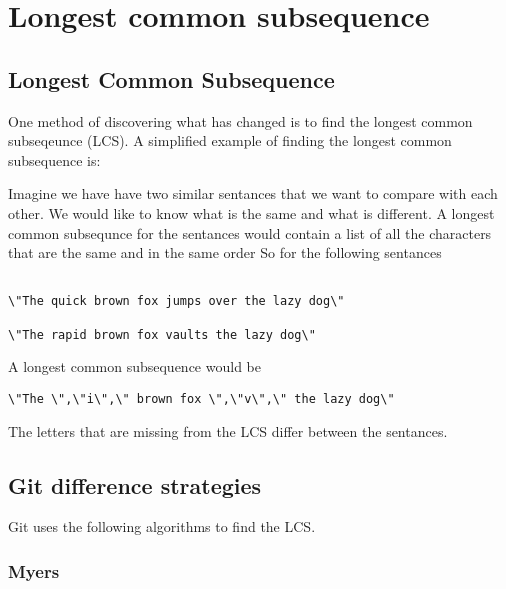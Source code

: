 \chapter{Longest common subsequence}

\section{Longest Common Subsequence}
One method of discovering what has changed is to find the longest common subseqeunce (LCS).
A simplified example of finding the longest common subsequence is:

Imagine we have have two similar sentances that we want to compare with each other.  
We would like to know what is the same and what is different.
A longest common subsequnce for the sentances would contain a list of all the characters that are the same and in the same order
So for the following sentances

\begin{verbatim}

\"The quick brown fox jumps over the lazy dog\"

\"The rapid brown fox vaults the lazy dog\"

\end{verbatim}
A longest common subsequence would be
\begin{verbatim}
\"The \",\"i\",\" brown fox \",\"v\",\" the lazy dog\"
\end{verbatim}
The letters that are missing from the LCS differ between the sentances.

\section{Git difference strategies}
Git uses the following algorithms to find the LCS.

\subsection{Myers}


